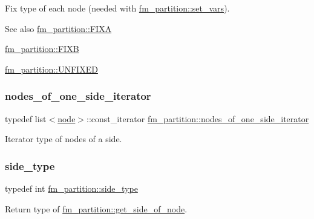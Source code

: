 Fix type of each node (needed with \mbox{\hyperlink{classfm__partition_aa15471da2b6a0f14060b0c4091c6b05c}{fm\+\_\+partition\+::set\+\_\+vars}}).

\begin{DoxySeeAlso}{See also}
\mbox{\hyperlink{classfm__partition_a468a80e072d3ff18e5da33005825bcb1}{fm\+\_\+partition\+::\+F\+I\+XA}} 

\mbox{\hyperlink{classfm__partition_a0b9a66f0e8093ee83482f93d6aa5b2eb}{fm\+\_\+partition\+::\+F\+I\+XB}} 

\mbox{\hyperlink{classfm__partition_a24447561db0ea633212c597c5e1fca56}{fm\+\_\+partition\+::\+U\+N\+F\+I\+X\+ED}} 
\end{DoxySeeAlso}
\mbox{\label{classfm__partition_ac8b7b5253476118e5f7bbad2fe8af285}} 
\subsubsection{\texorpdfstring{nodes\+\_\+of\+\_\+one\+\_\+side\+\_\+iterator}{nodes\_of\_one\_side\_iterator}}
{\footnotesize\ttfamily typedef list$<$\mbox{\hyperlink{classnode}{node}}$>$\+::const\+\_\+iterator \mbox{\hyperlink{classfm__partition_ac8b7b5253476118e5f7bbad2fe8af285}{fm\+\_\+partition\+::nodes\+\_\+of\+\_\+one\+\_\+side\+\_\+iterator}}}

Iterator type of nodes of a side. \mbox{\label{classfm__partition_a7cdff1bea3740a287387e8408e16ca79}} 
\subsubsection{\texorpdfstring{side\+\_\+type}{side\_type}}
{\footnotesize\ttfamily typedef int \mbox{\hyperlink{classfm__partition_a7cdff1bea3740a287387e8408e16ca79}{fm\+\_\+partition\+::side\+\_\+type}}}

Return type of \mbox{\hyperlink{classfm__partition_af5f6ad817fe30760f3bc5470bd70c4c9}{fm\+\_\+partition\+::get\+\_\+side\+\_\+of\+\_\+node}}.

